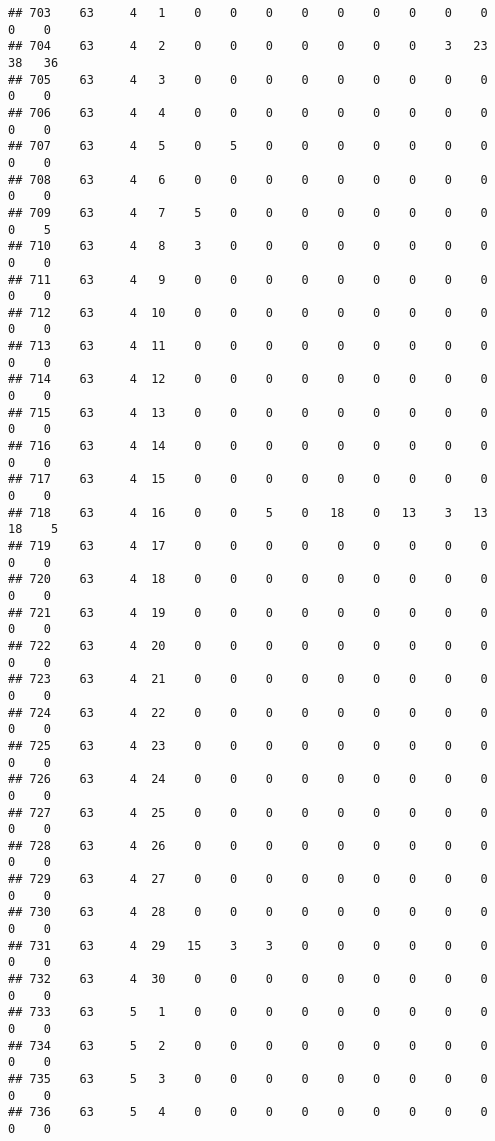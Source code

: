 \documentclass[]{article}
\begin{document}
\begin{verbatim}
## 703    63     4   1    0    0    0    0    0    0    0    0    0    0    0
## 704    63     4   2    0    0    0    0    0    0    0    3   23   38   36
## 705    63     4   3    0    0    0    0    0    0    0    0    0    0    0
## 706    63     4   4    0    0    0    0    0    0    0    0    0    0    0
## 707    63     4   5    0    5    0    0    0    0    0    0    0    0    0
## 708    63     4   6    0    0    0    0    0    0    0    0    0    0    0
## 709    63     4   7    5    0    0    0    0    0    0    0    0    0    5
## 710    63     4   8    3    0    0    0    0    0    0    0    0    0    0
## 711    63     4   9    0    0    0    0    0    0    0    0    0    0    0
## 712    63     4  10    0    0    0    0    0    0    0    0    0    0    0
## 713    63     4  11    0    0    0    0    0    0    0    0    0    0    0
## 714    63     4  12    0    0    0    0    0    0    0    0    0    0    0
## 715    63     4  13    0    0    0    0    0    0    0    0    0    0    0
## 716    63     4  14    0    0    0    0    0    0    0    0    0    0    0
## 717    63     4  15    0    0    0    0    0    0    0    0    0    0    0
## 718    63     4  16    0    0    5    0   18    0   13    3   13   18    5
## 719    63     4  17    0    0    0    0    0    0    0    0    0    0    0
## 720    63     4  18    0    0    0    0    0    0    0    0    0    0    0
## 721    63     4  19    0    0    0    0    0    0    0    0    0    0    0
## 722    63     4  20    0    0    0    0    0    0    0    0    0    0    0
## 723    63     4  21    0    0    0    0    0    0    0    0    0    0    0
## 724    63     4  22    0    0    0    0    0    0    0    0    0    0    0
## 725    63     4  23    0    0    0    0    0    0    0    0    0    0    0
## 726    63     4  24    0    0    0    0    0    0    0    0    0    0    0
## 727    63     4  25    0    0    0    0    0    0    0    0    0    0    0
## 728    63     4  26    0    0    0    0    0    0    0    0    0    0    0
## 729    63     4  27    0    0    0    0    0    0    0    0    0    0    0
## 730    63     4  28    0    0    0    0    0    0    0    0    0    0    0
## 731    63     4  29   15    3    3    0    0    0    0    0    0    0    0
## 732    63     4  30    0    0    0    0    0    0    0    0    0    0    0
## 733    63     5   1    0    0    0    0    0    0    0    0    0    0    0
## 734    63     5   2    0    0    0    0    0    0    0    0    0    0    0
## 735    63     5   3    0    0    0    0    0    0    0    0    0    0    0
## 736    63     5   4    0    0    0    0    0    0    0    0    0    0    0

\end{verbatim}
\end{document}
